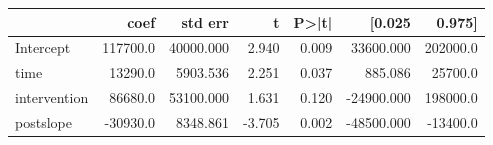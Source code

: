 \begin{tabular}{lrrrrrr}
\hline
{} &      coef &    std err &      t &  P>|t| &     [0.025 &    0.975] \\
\hline
Intercept    &  117700.0 &  40000.000 &  2.940 &  0.009 &  33600.000 &  202000.0 \\
time         &   13290.0 &   5903.536 &  2.251 &  0.037 &    885.086 &   25700.0 \\
intervention &   86680.0 &  53100.000 &  1.631 &  0.120 & -24900.000 &  198000.0 \\
postslope    &  -30930.0 &   8348.861 & -3.705 &  0.002 & -48500.000 &  -13400.0 \\
\hline
\end{tabular}
